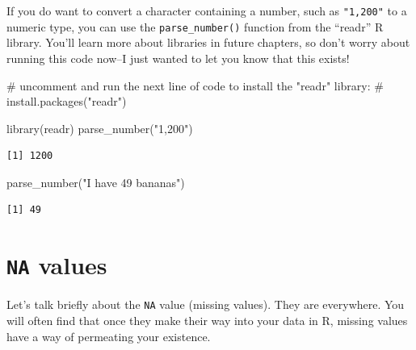 \documentclass[
  letterpaper,
  DIV=11,
  numbers=noendperiod]{scrreprt}
\newenvironment{Shaded}{\begin{snugshade}}{\end{snugshade}}
\newcommand{\CommentTok}[1]{\textcolor[rgb]{0.37,0.37,0.37}{#1}}
\newcommand{\FunctionTok}[1]{\textcolor[rgb]{0.28,0.35,0.67}{#1}}
\newcommand{\NormalTok}[1]{\textcolor[rgb]{0.00,0.23,0.31}{#1}}
\newcommand{\StringTok}[1]{\textcolor[rgb]{0.13,0.47,0.30}{#1}}
\begin{document}
\begin{tcolorbox}[enhanced jigsaw, rightrule=.15mm, toptitle=1mm, title=\textcolor{quarto-callout-tip-color}{\faLightbulb}\hspace{0.5em}{Extracting numeric values from characters}, leftrule=.75mm, bottomtitle=1mm, colbacktitle=quarto-callout-tip-color!10!white, coltitle=black, titlerule=0mm, opacityback=0, colframe=quarto-callout-tip-color-frame, arc=.35mm, opacitybacktitle=0.6, bottomrule=.15mm, left=2mm, breakable, toprule=.15mm, colback=white]

If you do want to convert a character containing a number, such as
\texttt{"1,200"} to a numeric type, you can use the
\texttt{parse\_number()} function from the ``readr'' R library. You'll
learn more about libraries in future chapters, so don't worry about
running this code now--I just wanted to let you know that this exists!

\begin{Shaded}
\begin{Highlighting}[]
\CommentTok{\# uncomment and run the next line of code to install the "readr" library:}
\CommentTok{\# install.packages("readr")}

\FunctionTok{library}\NormalTok{(readr)}
\FunctionTok{parse\_number}\NormalTok{(}\StringTok{"1,200"}\NormalTok{)}
\end{Highlighting}
\end{Shaded}

\begin{verbatim}
[1] 1200
\end{verbatim}

\begin{Shaded}
\begin{Highlighting}[]
\FunctionTok{parse\_number}\NormalTok{(}\StringTok{"I have 49 bananas"}\NormalTok{)}
\end{Highlighting}
\end{Shaded}

\begin{verbatim}
[1] 49
\end{verbatim}

\end{tcolorbox}

\section{\texorpdfstring{\texttt{NA}
values}{NA values}}\label{na-values}

Let's talk briefly about the \texttt{NA} value (missing values). They
are everywhere. You will often find that once they make their way into
your data in R, missing values have a way of permeating your existence.
\end{document}
